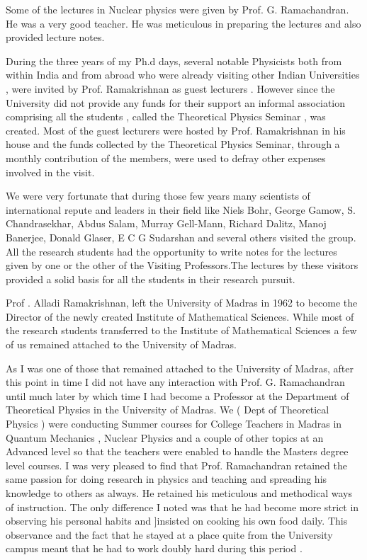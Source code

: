Some of the lectures in Nuclear physics were given by Prof. G. Ramachandran. He was a very good teacher. He was meticulous in preparing the lectures and also provided lecture notes. 

During the three years of my Ph.d days, several notable Physicists both from within India and from abroad who were already visiting other Indian Universities , were invited  by Prof. Ramakrishnan as guest lecturers . However since the University did not provide any funds for their support an informal association comprising all the students , called the Theoretical Physics Seminar , was created. Most of the guest lecturers were hosted by Prof. Ramakrishnan in his house and the funds collected by the Theoretical Physics Seminar, through a monthly contribution of the members,  were used to defray other expenses involved in the visit.

We were very fortunate that during those few years many scientists of international repute and leaders in their field like Niels Bohr, George Gamow, S. Chandrasekhar, Abdus Salam, Murray Gell-Mann, Richard Dalitz, Manoj Banerjee, Donald Glaser, E C G Sudarshan and several others visited the group. All the research students had  the opportunity to write notes for the lectures given by one or the other of the Visiting Professors.The lectures by these visitors provided a solid basis for all the students in their research pursuit. 

Prof . Alladi Ramakrishnan, left the University of Madras in 1962 to become  the Director of the newly created Institute of Mathematical Sciences. While most of the research students transferred to the Institute of Mathematical Sciences a few of us remained attached to the University of Madras.

As I was one of those that remained attached to the University of  Madras, after this point in time I did not have any interaction with Prof. G. Ramachandran until much later by which time I had become a Professor at the Department of Theoretical Physics in the University of Madras. We ( Dept of Theoretical Physics ) were conducting Summer courses for College Teachers in Madras in Quantum Mechanics , Nuclear Physics and a couple of other topics at an Advanced level so that the teachers were enabled to handle the Masters degree level courses. I was very pleased to find that Prof. Ramachandran retained the same passion for doing research in physics and teaching and spreading his knowledge to others as always. He retained his meticulous and methodical ways of instruction. The only difference I noted was that he had become more strict in observing his personal habits and ]insisted on cooking his own food daily. This observance and the fact that he stayed at a place quite from the University campus meant that he had to work doubly hard during this period . 


